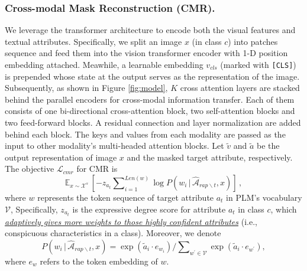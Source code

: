 \documentclass[letterpaper]{article} \usepackage{aaai23}  \usepackage{times}  \usepackage{helvet}  \usepackage{courier}  \usepackage[hyphens]{url}  \usepackage{graphicx} \urlstyle{rm} \def\UrlFont{\rm}  \usepackage{natbib}  \usepackage{caption} \frenchspacing  \setlength{\pdfpagewidth}{8.5in}  \setlength{\pdfpageheight}{11in}  \usepackage{algorithm}
\newcommand{\wen}[1]{{\color{black}#1}}
\begin{document}
\subsubsection{\textbf{Cross-modal Mask Reconstruction (CMR).}} \label{sec:CMR}
We leverage the transformer architecture to encode both the visual features and textual attributes.
Specifically, we split an image $x$ (in class $c$) into patches sequence 
 and 
{feed} them into the vision transformer encoder
with 1-D position embedding attached.
Meawhile, a learnable embedding $v_{cls}$ (marked with {\tt [CLS]}) is prepended 
whose state at the output serves as the representation of the image. 
Subsequently, as shown in Figure \ref{fig:model}, $K$ cross attention layers are stacked behind the parallel encoders for cross-modal information transfer. Each of them consists of one bi-directional cross-attention block, two self-attention blocks and two feed-forward blocks. A residual connection and layer normalization are added behind each block.
The keys and values \cite{DBLP:conf/nips/VaswaniSPUJGKP17} from each modality are passed as the input to other modality’s multi-headed attention blocks.
Let
$\tilde{v}$ and $\tilde{a}$ be the output representation of image $x$ and the masked target attribute, respectively.
\wen{T}he objective $\mathcal{L}_{cmr}$ for CMR is
\begin{equation}
\mathbb{E}_{x \sim \mathcal{X}^s}\,[ - z_{a_{t}} \sum\nolimits_{i=1}^{Len(w)} \log P(w_i\,|\,\widehat{\mathcal{A}}_{rap\backslash t}, x)] \,,
\end{equation}
where $w$ represents the token sequence of target attribute $a_{t}$ 
\wen{in}
PLM's vocabulary $\mathcal{V}$, 
Specifically, $z_{a_{t}}$ is the expressive degree score for attribute  $a_{t}$ in class $c$, 
which \ul{\emph{adaptively gives more weights to 
 those 
highly confident attributes}} (i.e., conspicuous characteristics in a class).
Moreover, we denote  
\begin{equation}
P(w_i\,|\,\widehat{\mathcal{A}}_{rap\backslash t}, x) = {\exp \left(\tilde{a}_i \cdot e_{w_i}\right)}/{\sum\nolimits_{w^\prime \in \mathcal{V}} \exp \left(\tilde{a}_i \cdot e_{w^\prime}\right)},
\end{equation}
where $e_w$ refers to the token embedding of $w$.
\end{document}
